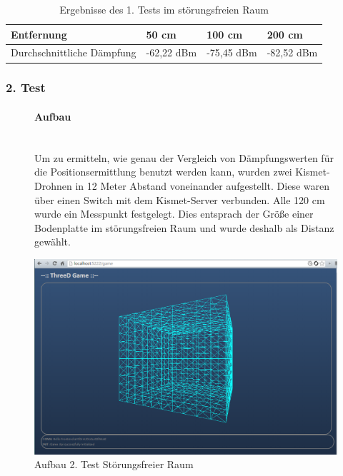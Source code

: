 \documentclass[a4paper]{spie}  %
\begin{document}
\begin{table}[H]
\centering
	\begin{tabular}{ | p{2.5cm} | l | l | l | }
		\hline 
		Entfernung	& 50 cm	& 100 cm	& 200 cm	\\ \hline
		Durchschnittliche Dämpfung & -62,22 dBm	& -75,45 dBm	& -82,52 dBm \\
		\hline
	\end{tabular}
	\caption{Ergebnisse des 1. Tests im störungsfreien Raum}
	\label{tab:probeTab}
\end{table}

\subsubsection{2. Test}\label{testNr2}

\begin{figure}[H]
\begin{minipage}[t]{0.4\textwidth}
\vspace{0pt}
\paragraph{Aufbau}\mbox{}\\
Um zu ermitteln, wie genau der Vergleich von Dämpfungswerten für die Positionsermittlung benutzt werden kann, wurden zwei Kismet-Drohnen in 12 Meter Abstand voneinander aufgestellt. Diese waren über einen Switch mit dem Kismet-Server verbunden. Alle 120 cm wurde ein Messpunkt festgelegt. Dies entsprach der Größe einer Bodenplatte im störungsfreien Raum und wurde deshalb als Distanz gewählt.
\end{minipage}
\hfill
\begin{minipage}[t]{0.5\textwidth}
\vspace{0pt}
		\includegraphics[width=\textwidth]{./images/FrontendInit.png}
		\caption{Aufbau 2. Test Störungsfreier Raum}
		\label{fig:test2}
\end{minipage}
\end{figure}
\end{document}
